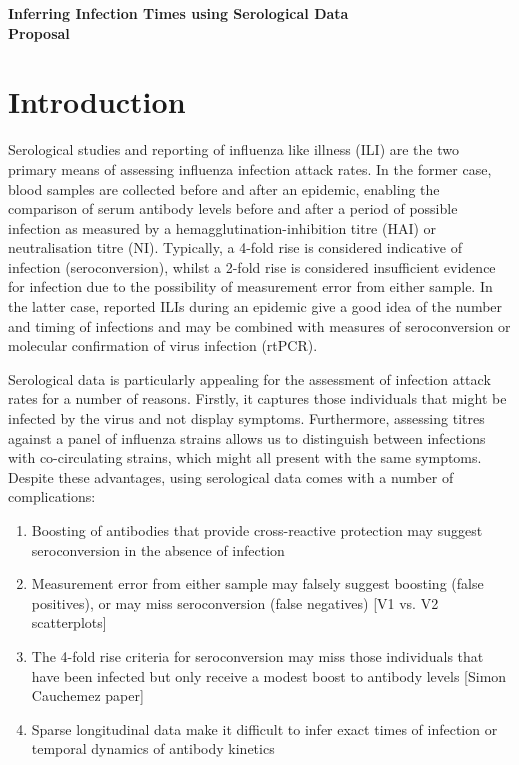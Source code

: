 \documentclass[a4paper,11pt,twoside]{article}
\begin{document}
\begin{center}
  \textbf{\LARGE Inferring Infection Times using Serological Data}\\[.5cm]
  \textbf{\Large Proposal}\\[.5cm]
\end{center}

\section{Introduction}
Serological studies and reporting of influenza like illness (ILI) are the two primary means of assessing influenza infection attack rates. In the former case, blood samples are collected before and after an epidemic, enabling the comparison of serum antibody levels before and after a period of possible infection as measured by a hemagglutination-inhibition titre (HAI) or neutralisation titre (NI). Typically, a 4-fold rise is considered indicative of infection (seroconversion), whilst a 2-fold rise is considered insufficient evidence for infection due to the possibility of measurement error from either sample. In the latter case, reported ILIs during an epidemic give a good idea of the number and timing of infections and may be combined with measures of seroconversion or molecular confirmation of virus infection (rtPCR).

Serological data is particularly appealing for the assessment of infection attack rates for a number of reasons. Firstly, it captures those individuals that might be infected by the virus and not display symptoms. Furthermore, assessing titres against a panel of influenza strains allows us to distinguish between infections with co-circulating strains, which might all present with the same symptoms. Despite these advantages, using serological data comes with a number of complications:

\begin{enumerate}
\item Boosting of antibodies that provide cross-reactive protection may suggest seroconversion in the absence of infection
\item Measurement error from either sample may falsely suggest boosting (false positives), or may miss seroconversion (false negatives) [V1 vs. V2 scatterplots]
\item The 4-fold rise criteria for seroconversion may miss those individuals that have been infected but only receive a modest boost to antibody levels [Simon Cauchemez paper]
\item Sparse longitudinal data make it difficult to infer exact times of infection or temporal dynamics of antibody kinetics
\end{enumerate}
\end{document}
